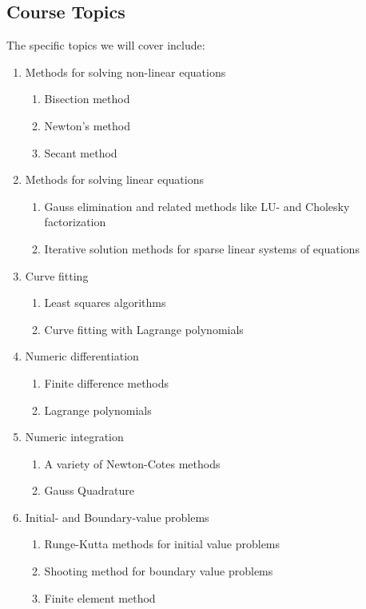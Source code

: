 \subsection{Course Topics}
The specific topics we will cover include:

\begin{enumerate}
\item Methods for solving non-linear equations
\begin{enumerate}
\item Bisection method
\item Newton's method
\item Secant method

\end{enumerate}
\item Methods for solving linear equations
\begin{enumerate}
\item Gauss elimination and related methods like LU- and Cholesky factorization
\item Iterative solution methods for sparse linear systems of equations
\end{enumerate}
\item Curve fitting
\begin{enumerate}
\item Least squares algorithms
\item Curve fitting with Lagrange polynomials
\end{enumerate}
\item Numeric differentiation
\begin{enumerate}
\item Finite difference methods
\item Lagrange polynomials
\end{enumerate}
\item Numeric integration
\begin{enumerate}
\item A variety of Newton-Cotes methods
\item Gauss Quadrature
\end{enumerate}

\item Initial- and Boundary-value problems 
\begin{enumerate}
\item Runge-Kutta methods for initial value problems
\item Shooting method for boundary value problems
\item Finite element method
\end{enumerate}

\end{enumerate}  

